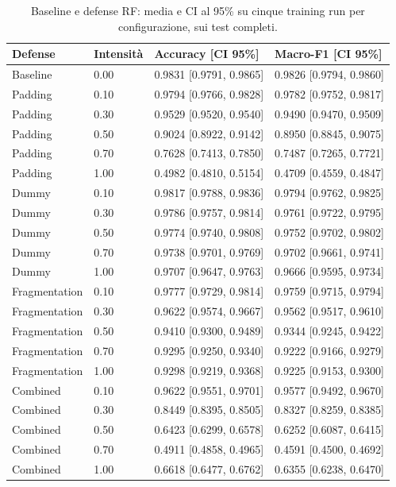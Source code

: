 \documentclass[11pt,a4paper]{article}
\begin{document}
\begin{table}[htbp]
\centering\scriptsize
\caption{Baseline e defense RF: media e CI al 95\% su cinque training run per configurazione, sui test completi.}
\label{tab:crossrun-defense-performance-rf}
\begin{tabular}{llll}
\toprule
Defense & Intensità & Accuracy [CI 95\%] & Macro-F1 [CI 95\%] \\
\midrule
Baseline & 0.00 & 0.9831 [0.9791, 0.9865] & 0.9826 [0.9794, 0.9860] \\
Padding & 0.10 & 0.9794 [0.9766, 0.9828] & 0.9782 [0.9752, 0.9817] \\
Padding & 0.30 & 0.9529 [0.9520, 0.9540] & 0.9490 [0.9470, 0.9509] \\
Padding & 0.50 & 0.9024 [0.8922, 0.9142] & 0.8950 [0.8845, 0.9075] \\
Padding & 0.70 & 0.7628 [0.7413, 0.7850] & 0.7487 [0.7265, 0.7721] \\
Padding & 1.00 & 0.4982 [0.4810, 0.5154] & 0.4709 [0.4559, 0.4847] \\
Dummy & 0.10 & 0.9817 [0.9788, 0.9836] & 0.9794 [0.9762, 0.9825] \\
Dummy & 0.30 & 0.9786 [0.9757, 0.9814] & 0.9761 [0.9722, 0.9795] \\
Dummy & 0.50 & 0.9774 [0.9740, 0.9808] & 0.9752 [0.9702, 0.9802] \\
Dummy & 0.70 & 0.9738 [0.9701, 0.9769] & 0.9702 [0.9661, 0.9741] \\
Dummy & 1.00 & 0.9707 [0.9647, 0.9763] & 0.9666 [0.9595, 0.9734] \\
Fragmentation & 0.10 & 0.9777 [0.9729, 0.9814] & 0.9759 [0.9715, 0.9794] \\
Fragmentation & 0.30 & 0.9622 [0.9574, 0.9667] & 0.9562 [0.9517, 0.9610] \\
Fragmentation & 0.50 & 0.9410 [0.9300, 0.9489] & 0.9344 [0.9245, 0.9422] \\
Fragmentation & 0.70 & 0.9295 [0.9250, 0.9340] & 0.9222 [0.9166, 0.9279] \\
Fragmentation & 1.00 & 0.9298 [0.9219, 0.9368] & 0.9225 [0.9153, 0.9300] \\
Combined & 0.10 & 0.9622 [0.9551, 0.9701] & 0.9577 [0.9492, 0.9670] \\
Combined & 0.30 & 0.8449 [0.8395, 0.8505] & 0.8327 [0.8259, 0.8385] \\
Combined & 0.50 & 0.6423 [0.6299, 0.6578] & 0.6252 [0.6087, 0.6415] \\
Combined & 0.70 & 0.4911 [0.4858, 0.4965] & 0.4591 [0.4500, 0.4692] \\
Combined & 1.00 & 0.6618 [0.6477, 0.6762] & 0.6355 [0.6238, 0.6470] \\
\bottomrule
\end{tabular}
\end{table}
\end{document}
